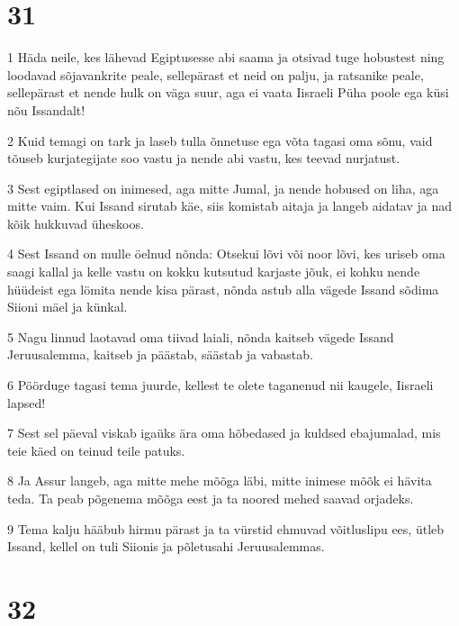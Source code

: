 \chapter{31}

\par 1 Häda neile, kes lähevad Egiptusesse abi saama ja otsivad tuge hobustest ning loodavad sõjavankrite peale, sellepärast et neid on palju, ja ratsanike peale, sellepärast et nende hulk on väga suur, aga ei vaata Iisraeli Püha poole ega küsi nõu Issandalt!
\par 2 Kuid temagi on tark ja laseb tulla õnnetuse ega võta tagasi oma sõnu, vaid tõuseb kurjategijate soo vastu ja nende abi vastu, kes teevad nurjatust.
\par 3 Sest egiptlased on inimesed, aga mitte Jumal, ja nende hobused on liha, aga mitte vaim. Kui Issand sirutab käe, siis komistab aitaja ja langeb aidatav ja nad kõik hukkuvad üheskoos.
\par 4 Sest Issand on mulle öelnud nõnda: Otsekui lõvi või noor lõvi, kes uriseb oma saagi kallal ja kelle vastu on kokku kutsutud karjaste jõuk, ei kohku nende hüüdeist ega lömita nende kisa pärast, nõnda astub alla vägede Issand sõdima Siioni mäel ja künkal.
\par 5 Nagu linnud laotavad oma tiivad laiali, nõnda kaitseb vägede Issand Jeruusalemma, kaitseb ja päästab, säästab ja vabastab.
\par 6 Pöörduge tagasi tema juurde, kellest te olete taganenud nii kaugele, Iisraeli lapsed!
\par 7 Sest sel päeval viskab igaüks ära oma hõbedased ja kuldsed ebajumalad, mis teie käed on teinud teile patuks.
\par 8 Ja Assur langeb, aga mitte mehe mõõga läbi, mitte inimese mõõk ei hävita teda. Ta peab põgenema mõõga eest ja ta noored mehed saavad orjadeks.
\par 9 Tema kalju hääbub hirmu pärast ja ta vürstid ehmuvad võitluslipu ees, ütleb Issand, kellel on tuli Siionis ja põletusahi Jeruusalemmas.

\chapter{32}

